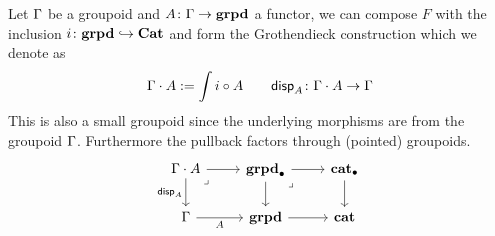 \begin{defn}
  Let $\Gamma$ be a groupoid and $A \colon \Gamma \to \mathbf{grpd}$ a functor,
  we can compose $F$ with the inclusion $i \colon \mathbf{grpd} \hookrightarrow \mathbf{Cat}$
  and form the Grothendieck construction which we denote as
  \[ \Gamma \cdot A := \int i \circ A \quad \quad \mathsf{disp}_{A} \colon \Gamma \cdot A \to \Gamma\]
  This is also a small groupoid since the underlying morphisms are
  from the groupoid $\Gamma$.
  Furthermore the pullback factors through (pointed) groupoids.
  \[\begin{tikzcd}
    {\Ga \cdot A} & \ptgrpd & \ptcat \\
    \Ga & \grpd & \cat \\
    {}
    \arrow[from=1-1, to=1-2]
    \arrow["\disp{A}"', from=1-1, to=2-1]
    \arrow["\lrcorner"{anchor=center, pos=0.125}, draw=none, from=1-1, to=2-2]
    \arrow[from=1-2, to=1-3]
    \arrow[from=1-2, to=2-2]
    \arrow["\lrcorner"{anchor=center, pos=0.125}, draw=none, from=1-2, to=2-3]
    \arrow[from=1-3, to=2-3]
    \arrow["A"', from=2-1, to=2-2]
    \arrow[from=2-2, to=2-3]
  \end{tikzcd}\]
\end{defn}

\medskip

